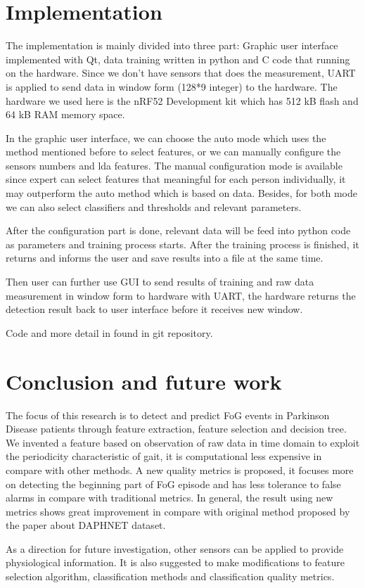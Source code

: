 \documentclass[article]{article}
\begin{document}
\section{Implementation}
   The implementation is mainly divided into three part: Graphic user interface implemented with Qt, data training written in python and C code that running on the hardware. Since we don't have sensors that does the measurement, UART is applied to send data in window form (128*9 integer) to the hardware. The hardware we used here is the nRF52 Development kit which has 512 kB flash and 64 kB RAM memory space.  
        
   
   In the graphic user interface, we can choose the auto mode which uses the method mentioned before to select features, or we can manually configure the sensors numbers and lda features. The manual configuration mode is available since expert can select features that meaningful for each person individually, it may outperform the auto method which is based on data. Besides, for both mode we can also select classifiers and thresholds and relevant parameters. 
   
   After the configuration part is done, relevant data will be feed into python code as parameters and training process starts. After the training process is finished, it returns and informs the user and save results into a file at the same time. 
   
   Then user can further use GUI to send results of training and raw data measurement in window form to hardware with UART, the hardware returns the detection result back to user interface before it receives new window.
   
	Code and more detail in found in git repository.
   
   
  
\section{Conclusion and future work}
The focus of this research is to detect and predict FoG events in Parkinson Disease patients through feature extraction, feature selection and decision tree.
We invented a feature based on observation of raw data in time domain to exploit the periodicity characteristic of gait, it is computational less expensive in compare with other methods. A new quality metrics is proposed, it focuses more on detecting the beginning part of FoG episode and has less tolerance to false alarms in compare with traditional metrics. In general, the result using new metrics shows great improvement in compare with original method proposed by the paper about DAPHNET dataset.

As a direction for future investigation, other sensors can be applied to provide physiological information. It is also suggested to make modifications to feature selection algorithm, classification methods and classification quality metrics.  

    



\nocite{*}
		
\end{document}
